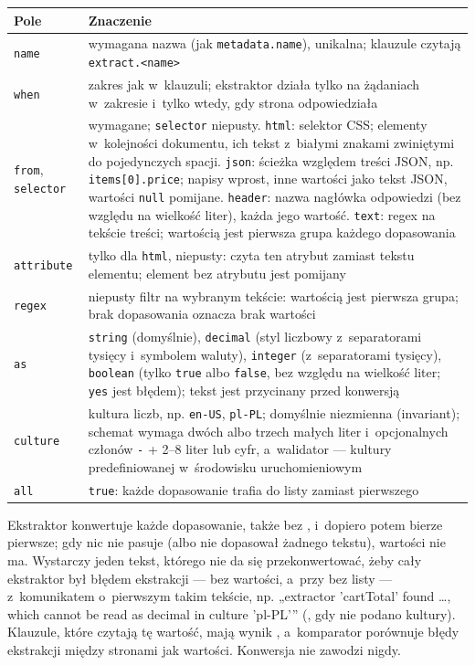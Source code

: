 {\small
\begin{tabularx}{\linewidth}{@{}l >{\raggedright\arraybackslash}X@{}}
\toprule
Pole & Znaczenie \\
\midrule
\texttt{name} & wymagana nazwa (jak \texttt{metadata.name}), unikalna; klauzule czytają
\texttt{extract.<name>} \\
\texttt{when} & zakres jak w~klauzuli; ekstraktor działa tylko na żądaniach w~zakresie i~tylko
wtedy, gdy strona odpowiedziała \\
\texttt{from}, \texttt{selector} & wymagane; \texttt{selector} niepusty. \texttt{html}:
selektor CSS; elementy w~kolejności dokumentu, ich tekst z~białymi znakami zwiniętymi do
pojedynczych spacji. \texttt{json}: ścieżka względem treści JSON, np. \texttt{items[0].price};
napisy wprost, inne wartości jako tekst JSON, wartości \texttt{null} pomijane. \texttt{header}:
nazwa nagłówka odpowiedzi (bez względu na wielkość liter), każda jego wartość. \texttt{text}:
regex na tekście treści; wartością jest pierwsza grupa każdego dopasowania \\
\texttt{attribute} & tylko dla \texttt{html}, niepusty: czyta ten atrybut zamiast tekstu
elementu; element bez atrybutu jest pomijany \\
\texttt{regex} & niepusty filtr na wybranym tekście: wartością jest pierwsza grupa; brak
dopasowania oznacza brak wartości \\
\texttt{as} & \texttt{string} (domyślnie), \texttt{decimal} (styl liczbowy z~separatorami
tysięcy i~symbolem waluty), \texttt{integer} (z~separatorami tysięcy), \texttt{boolean} (tylko
\texttt{true} albo \texttt{false}, bez względu na wielkość liter; \texttt{yes} jest błędem);
tekst jest przycinany przed konwersją \\
\texttt{culture} & kultura liczb, np. \texttt{en-US}, \texttt{pl-PL}; domyślnie niezmienna
(invariant); schemat wymaga dwóch albo trzech małych liter i~opcjonalnych członów
\texttt{-} + 2--8 liter lub cyfr, a~walidator --- kultury predefiniowanej w~środowisku
uruchomieniowym \\
\texttt{all} & \texttt{true}: każde dopasowanie trafia do listy zamiast pierwszego \\
\bottomrule
\end{tabularx}
}

Ekstraktor konwertuje każde dopasowanie, także bez , i~dopiero potem
bierze pierwsze; gdy nic nie pasuje (albo  nie dopasował żadnego tekstu),
wartości nie ma. Wystarczy jeden tekst, którego nie da się przekonwertować, żeby cały ekstraktor
był błędem ekstrakcji --- bez wartości, a~przy  bez listy --- z~komunikatem
o~pierwszym takim tekście, np. „extractor 'cartTotal' found \textquotedbl{}…\textquotedbl{},
which cannot be read as decimal in culture 'pl-PL'” (, gdy nie podano
kultury). Klauzule, które czytają tę wartość, mają wynik , a~komparator
porównuje błędy ekstrakcji między stronami jak wartości. Konwersja  nie zawodzi
nigdy.

